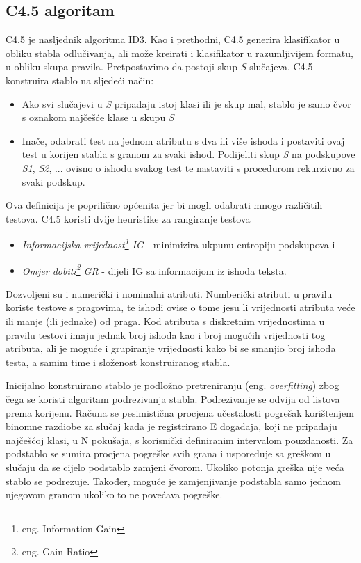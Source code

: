 \subsection{C4.5 algoritam}

C4.5 je nasljednik algoritma ID3. Kao i prethodni, C4.5 generira klasifikator u obliku stabla odlučivanja, ali može 
kreirati i klasifikator u razumljivijem formatu, u obliku skupa pravila. Pretpostavimo da postoji skup \textit{S} 
slučajeva. C4.5 konstruira stablo na sljedeći način:
\begin{itemize}
   \item Ako svi slučajevi u \textit{S} pripadaju istoj klasi ili je skup mal, stablo je samo čvor s oznakom najčešće klase u skupu \textit{S}
   \item Inače, odabrati test na jednom atributu s dva ili više ishoda i postaviti ovaj test u korijen stabla s granom za svaki ishod. Podijeliti skup \textit{S} na podskupove \textit{S1}, \textit{S2}, ... ovisno o ishodu svakog test te nastaviti s procedurom rekurzivno za svaki podskup.
\end{itemize}

Ova definicija je poprilično općenita jer bi mogli odabrati mnogo različitih testova. C4.5 koristi dvije heuristike za rangiranje testova
\begin{itemize}
   \item \textit{Informacijska vrijednost\footnote{eng. Information Gain} IG}  - minimizira ukpunu entropiju podskupova i
   \item \textit{Omjer dobiti\footnote{eng. Gain Ratio} GR} - dijeli IG sa informacijom iz ishoda teksta.
\end{itemize}

Dozvoljeni su i numerički i nominalni atributi. Numberički atributi u pravilu koriste testove s pragovima, te ishodi
ovise o tome jesu li vrijednosti atributa veće ili manje (ili jednake) od praga. Kod atributa s diskretnim vrijednostima
u pravilu testovi imaju jednak broj ishoda kao i broj mogućih vrijednosti tog atributa, ali je moguće i grupiranje 
vrijednosti kako bi se smanjio broj ishoda testa, a samim time i složenost konstruiranog stabla.

Inicijalno konstruirano stablo je podložno pretreniranju (eng. \textit{overfitting}) zbog čega se koristi algoritam podrezivanja stabla. Podrezivanje se odvija od listova prema korijenu. Računa se pesimistična procjena učestalosti pogrešak korištenjem binomne razdiobe za slučaj kada je registrirano E događaja, koji ne pripadaju najčešćoj klasi, u N pokušaja, s korisnički definiranim intervalom pouzdanosti. Za podstablo se sumira procjena pogreške svih grana i uspoređuje sa greškom u slučaju da se cijelo podstablo zamjeni čvorom. Ukoliko potonja greška nije veća stablo se podrezuje. Također, moguće je zamjenjivanje podstabla samo jednom njegovom granom ukoliko to ne povećava pogreške\cite{Wu01}.

